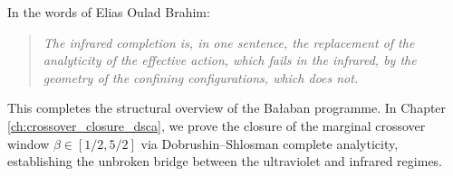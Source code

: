 In the words of Elias Oulad Brahim:
\begin{quote}
\emph{The infrared completion is, in one sentence, the replacement of the analyticity of the effective action, which fails in the infrared, by the geometry of the confining configurations, which does not.}
\end{quote}

This completes the structural overview of the Ba\l aban programme. In Chapter \ref{ch:crossover_closure_dsca}, we prove the closure of the marginal crossover window $\beta \in [1/2, 5/2]$ via Dobrushin--Shlosman complete analyticity, establishing the unbroken bridge between the ultraviolet and infrared regimes.